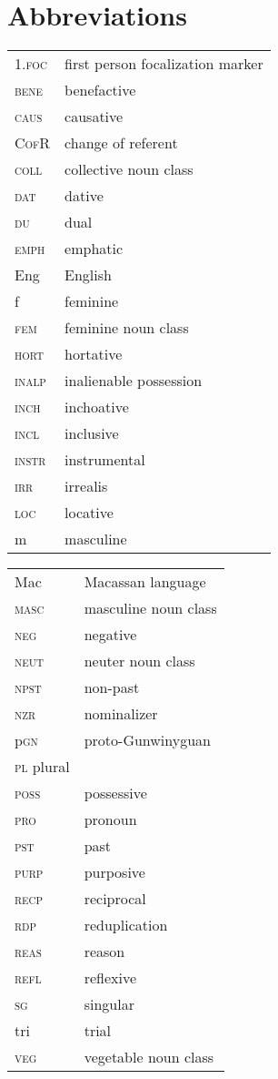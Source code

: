 \documentclass[output=paper]{langscibook}
\begin{document}
\section*{Abbreviations}
\noindent
\begin{tabularx}{.45\textwidth}{lQ}
1.\textsc{foc} & first person focalization marker\\
\textsc{bene} & benefactive\\
\textsc{caus} & causative\\
\textsc{CofR} & change of referent\\
\textsc{coll} & collective noun class\\
\textsc{dat} & dative\\
\textsc{du} & dual\\
\textsc{emph} & emphatic\\
Eng & English\\
f & feminine\\
\textsc{fem} & feminine noun class\\
\textsc{hort} & hortative\\
\textsc{inalp} & inalienable possession\\
\textsc{inch} & inchoative\\
\textsc{incl} & inclusive\\
\textsc{instr} & instrumental\\
\textsc{irr} & irrealis\\
\textsc{loc} & locative\\
m & masculine\\
\end{tabularx}

\begin{tabularx}{.45\textwidth}{lQ}
Mac & Macassan language\\
\textsc{masc} & masculine noun class\\
\textsc{neg} & negative\\
\textsc{neut} & neuter noun class\\
\textsc{npst} & non-past\\
\textsc{nzr} & nominalizer\\
p\textsc{gn} & proto-Gunwinyguan\\
\textsc{pl} plural\\
\textsc{poss} & possessive\\
\textsc{pro} & pronoun\\
\textsc{pst} & past\\
\textsc{purp} & purposive\\
\textsc{recp} & reciprocal\\
\textsc{rdp} & reduplication\\
\textsc{reas} & reason\\
\textsc{refl} & reflexive\\
\textsc{sg} & singular\\
tri & trial\\
\textsc{veg} & vegetable noun class\\
\end{tabularx}


\sloppy\printbibliography[heading=subbibliography,notkeyword=this]
\end{document}
